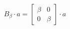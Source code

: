 \documentclass[preview]{standalone}
\begin{document}
\begin{align*}
B_{\beta} \cdot a = \begin{bmatrix} \beta & 0 \\ 0 & \beta\end{bmatrix} \cdot a
\end{align*}
\end{document}
